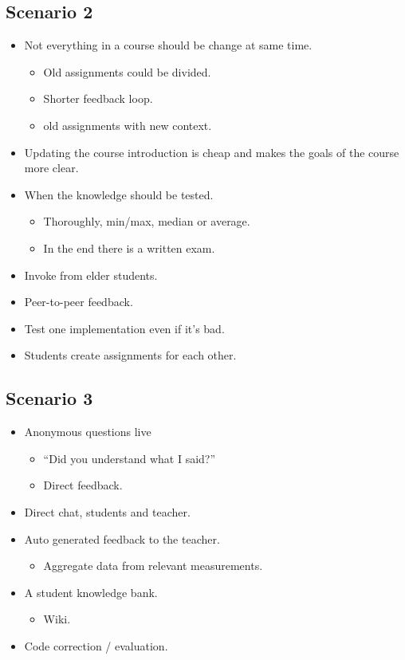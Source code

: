 \subsection*{Scenario 2}
\begin{itemize}
\item Not everything in a course should be change at same time.
\begin{itemize}
\item Old assignments could be divided.
\item Shorter feedback loop.
\item old assignments with new context.
\end{itemize}
\item Updating the course introduction is cheap and makes the goals of the course more clear.
\item When the knowledge should be tested.
\begin{itemize}
\item Thoroughly, min/max, median or average.
\item In the end there is a written exam.
\end{itemize}
\item Invoke from elder students.
\item Peer-to-peer feedback.
\item Test one implementation even if it's bad.
\item Students create assignments for each other.
\end{itemize}

\subsection*{Scenario 3}
\begin{itemize}
\item Anonymous questions live
\begin{itemize}
\item ``Did you understand what I said?''
\item Direct feedback.
\end{itemize}
\item Direct chat, students and teacher.
\item Auto generated feedback to the teacher.
\begin{itemize}
\item Aggregate data from relevant measurements.
\end{itemize}
\item A student knowledge bank.
\begin{itemize}
\item Wiki.
\end{itemize}
\item Code correction / evaluation.
\end{itemize}

